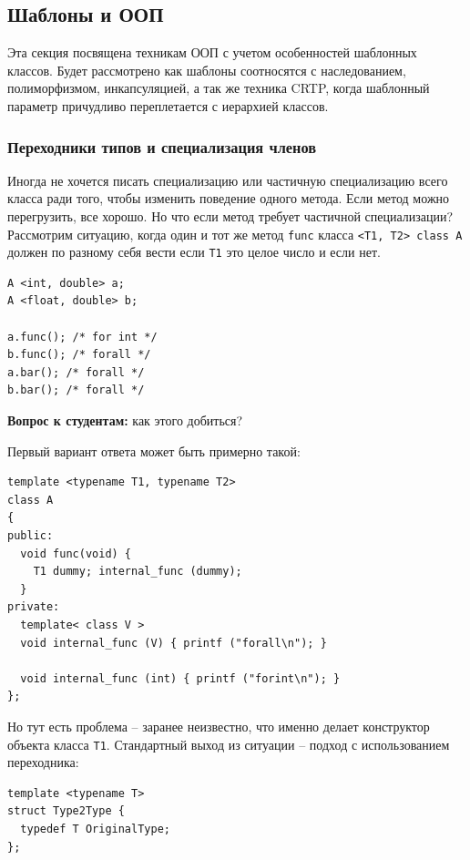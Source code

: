 \documentclass[a4paper,12pt,oneside]{article}
\newif\ifanswers
\begin{document}
\pagebreak
\subsection{Шаблоны и ООП}

Эта секция посвящена техникам ООП с учетом особенностей шаблонных классов. Будет рассмотрено как шаблоны соотносятся с наследованием, полиморфизмом, инкапсуляцией, а так же техника CRTP, когда шаблонный параметр причудливо переплетается с иерархией классов.

\subsubsection{Переходники типов и специализация членов}\label{MemberSpec}

Иногда не хочется писать специализацию или частичную специализацию всего класса ради того, чтобы изменить поведение одного метода. Если метод можно перегрузить, все хорошо. Но что если метод требует частичной специализации? Рассмотрим ситуацию, когда один и тот же метод \lstinline!func! класса \lstinline!<T1, T2> class A! должен по разному себя вести если \lstinline!T1! это целое число и если нет.

\begin{lstlisting}
A <int, double> a;
A <float, double> b;

a.func(); /* for int */
b.func(); /* forall */
a.bar(); /* forall */
b.bar(); /* forall */
\end{lstlisting}

\textbf{Вопрос к студентам:} как этого добиться?

\ifanswers
Первый вариант ответа может быть примерно такой:

\begin{lstlisting}
template <typename T1, typename T2>
class A
{
public:
  void func(void) { 
    T1 dummy; internal_func (dummy); 
  }
private:
  template< class V >
  void internal_func (V) { printf ("forall\n"); }

  void internal_func (int) { printf ("forint\n"); }
};
\end{lstlisting}

Но тут есть проблема -- заранее неизвестно, что именно делает конструктор объекта класса \lstinline!T1!. Стандартный выход из ситуации -- подход с использованием переходника: 

\begin{lstlisting}
template <typename T>
struct Type2Type {
  typedef T OriginalType;
};
\end{lstlisting}
\end{document}
